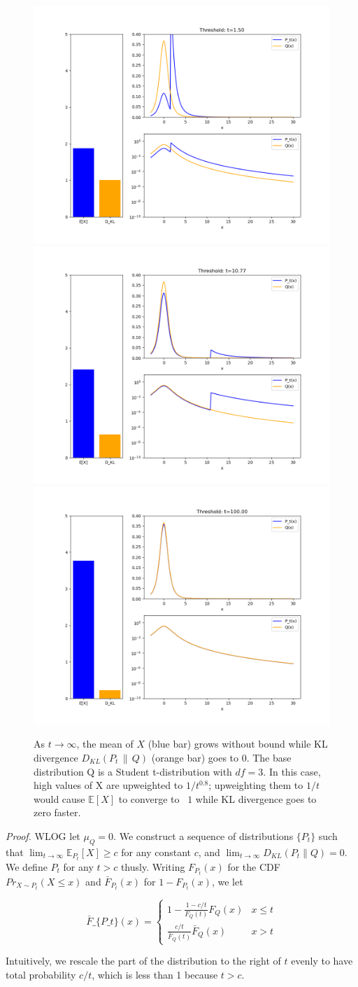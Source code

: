 \documentclass{article}
\begin{document}
\begin{figure}
    \label{fig1}
    \centering
    \includegraphics[width=0.3\linewidth]{goodhart_kl_001.png}
    \includegraphics[width=0.3\linewidth]{goodhart_kl_024.png}
    \includegraphics[width=0.3\linewidth]{goodhart_kl_050.png}
    \caption{As $t \to \infty$, the mean of $X$ (blue bar) grows without bound while KL divergence $D_{KL}(P_t \,\|\, Q)$ (orange bar) goes to 0. The base distribution Q is a Student t-distribution with $df=3$. In this case, high values of X are upweighted to $1/t^{0.8}$; upweighting them to $1/t$ would cause $\mathbb E[X]$ to converge to ~$1$ while KL divergence goes to zero faster.}
\end{figure}

\emph{Proof.} WLOG let \(\mu_Q = 0\). We construct a sequence of
distributions \(\{P_t\}\) such that
\(\lim_{t \to \infty} \mathbb E_{P_t}[X] \ge c\) for any constant \(c\),
and \(\lim_{t \to \infty} D_{KL}(P_t \| Q) = 0\). We define \(P_t\) for
any \(t > c\) thusly. Writing \(F_{P_t}(x)\) for the CDF
\(Pr_{X \sim P_t}(X \le x)\) and \(\bar F_{P_t}(x)\) for
\(1 - F_{P_t}(x)\), we let

$$ \bar F\_\{P\_t\}(x) =
\begin{cases} 1 - \frac{1 - c/t}{F_Q(t)}F_Q(x) & x \le t
\\ \frac{c/t}{\bar F_Q(t)}\bar F_Q(x) & x > t
\end{cases}
$$

Intuitively, we rescale the part of the distribution to the right of
\(t\) evenly to have total probability \(c/t\), which is less than 1
because \(t > c\).
\end{document}
